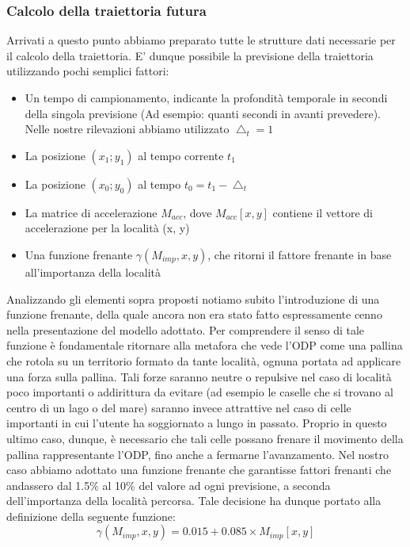 \subsubsection{Calcolo della traiettoria futura}
Arrivati a questo punto abbiamo preparato tutte le strutture dati necessarie
per il calcolo della traiettoria. E' dunque possibile la previsione della traiettoria
utilizzando pochi semplici fattori:
\begin{itemize}
\item Un tempo di campionamento, indicante la profondit\`a temporale in secondi
della singola previsione (Ad esempio: quanti secondi in avanti
prevedere). Nelle nostre rilevazioni abbiamo utilizzato $\bigtriangleup_{t} = 1$
\item La posizione $(x_{1}; y_{1})$ al tempo corrente $t_{1}$
\item La posizione $(x_{0}; y_{0})$ al tempo $t_{0} = t_{1} - \bigtriangleup_{t}$
\item La matrice di accelerazione $M_{acc}$, dove $M_{acc}[x,y]$ contiene il vettore di
accelerazione per la localit\`a (x, y)
\item Una funzione frenante $\gamma(M_{imp},x,y)$, che ritorni il fattore frenante in base
all'importanza della localit\`a
\end{itemize}
Analizzando gli elementi sopra proposti notiamo subito l'introduzione di
una funzione frenante, della quale ancora non era stato fatto espressamente
cenno nella presentazione del modello adottato. Per comprendere il senso di
tale funzione \`e fondamentale ritornare alla metafora che vede l'ODP come una
pallina che rotola su un territorio formato da tante localit\`a, ognuna portata
ad applicare una forza sulla pallina. Tali forze saranno neutre o repulsive
nel caso di localit\`a poco importanti o addirittura da evitare (ad esempio le
caselle che si trovano al centro di un lago o del mare) saranno invece attrattive
nel caso di celle importanti in cui l'utente ha soggiornato a lungo in passato.
Proprio in questo ultimo caso, dunque, \`e necessario che tali celle possano
frenare il movimento della pallina rappresentante l'ODP, fino anche a fermarne
l'avanzamento.
Nel nostro caso abbiamo adottato una funzione frenante che garantisse
fattori frenanti che andassero dal 1.5\% al 10\% del valore ad ogni previsione,
a seconda dell'importanza della localit\`a percorsa. Tale decisione ha dunque
portato alla definizione della seguente funzione:
\begin{equation}
    \gamma(M_{imp},x,y) = 0.015 + 0.085 \times M_{imp}[x,y]
\end{equation}
